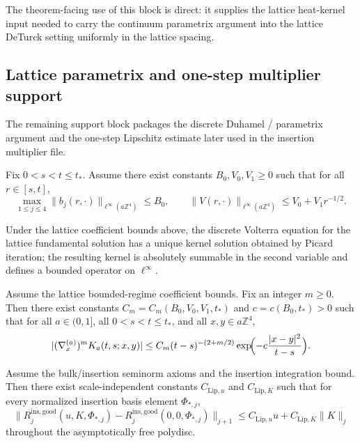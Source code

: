 The theorem-facing use of this block is direct: it supplies the lattice heat-kernel input needed to carry the continuum parametrix argument into the lattice DeTurck setting uniformly in the lattice spacing.

\subsection{Lattice parametrix and one-step multiplier support}
The remaining support block packages the discrete Duhamel / parametrix argument and the one-step Lipschitz estimate later used in the insertion multiplier file.

\begin{proposition}
Fix $0<s<t\le t_\ast$. Assume there exist constants $B_0,V_0,V_1\ge 0$ such that for all $r\in[s,t]$,
\[
\max_{1\le j\le 4}\|b_j(r,\cdot)\|_{\ell^\infty(a\mathbb Z^4)}\le B_0,
\qquad
\|V(r,\cdot)\|_{\ell^\infty(a\mathbb Z^4)}\le V_0 + V_1 r^{-1/2}.
\]
\end{proposition}

\begin{lemma}
Under the lattice coefficient bounds above, the discrete Volterra equation for the lattice fundamental solution has a unique kernel solution obtained by Picard iteration; the resulting kernel is absolutely summable in the second variable and defines a bounded operator on $\ell^\infty$.
\end{lemma}

\begin{theorem}
Assume the lattice bounded-regime coefficient bounds. Fix an integer $m\ge 0$. Then there exist constants $C_m=C_m(B_0,V_0,V_1,t_\ast)$ and $c=c(B_0,t_\ast)>0$ such that for all $a\in(0,1]$, all $0<s<t\le t_\ast$, and all $x,y\in a\mathbb Z^4$,
\[
|(\nabla_x^{(a)})^m K_a(t,s;x,y)|
\le C_m (t-s)^{-(2+m/2)}\exp\!\Bigl(-c\frac{|x-y|^2}{t-s}\Bigr).
\]
\end{theorem}

\begin{lemma}
Assume the bulk/insertion seminorm axioms and the insertion integration bound. Then there exist scale-independent constants $C_{\mathrm{Lip},u}$ and $C_{\mathrm{Lip},K}$ such that for every normalized insertion basis element $\Phi_{\ast,j}$,
\[
\bigl\|R^{\mathrm{ins,good}}_j(u,K,\Phi_{\ast,j}) - R^{\mathrm{ins,good}}_j(0,0,\Phi_{\ast,j})\bigr\|_{j+1}
\le C_{\mathrm{Lip},u}u + C_{\mathrm{Lip},K}\|K\|_j
\]
throughout the asymptotically free polydisc.
\end{lemma}

